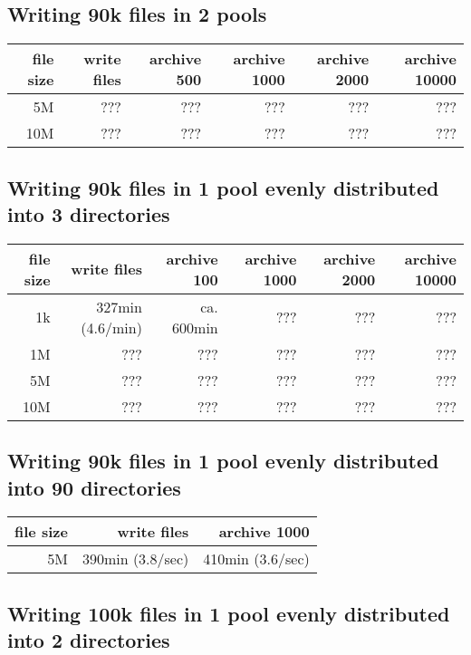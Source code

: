 \documentclass[a4paper,8pt]{scrartcl}
\begin{document}
\subsection{Writing 90k files in 2 pools}

\begin{tabular}{|r||r||r|r|r|r|}
  \hline
  file size & write files  & archive 500 & archive 1000 & archive 2000 & archive 10000 \\
  \hline
  5M        & ??? & ??? & ??? & ??? & ??? \\
  \hline
  10M       & ??? & ??? & ??? & ??? & ??? \\
  \hline
\end{tabular}

\subsection{Writing 90k files in 1 pool evenly distributed into 3 directories}
\begin{tabular}{|r||r||r|r|r|r|}
  \hline
  file size & write files  & archive 100 & archive 1000 & archive 2000 & archive 10000 \\
  \hline
  1k        & 327min (4.6/min) & ca. 600min & ??? & ??? & ??? \\
  \hline
  1M        & ??? & ??? & ??? & ??? & ??? \\
  \hline
  5M        & ??? & ??? & ??? & ??? & ??? \\
  \hline
  10M       & ??? & ??? & ??? & ??? & ??? \\
  \hline
\end{tabular}

\subsection{Writing 90k files in 1 pool evenly distributed into 90 directories}

\begin{tabular}{|r||r||r|}
  \hline
  file size & write files  & archive 1000 \\
  \hline
  5M        & 390min (3.8/sec) & 410min (3.6/sec) \\
  \hline
\end{tabular}

\subsection{Writing 100k files in 1 pool evenly distributed into 2 directories}
\end{document}
